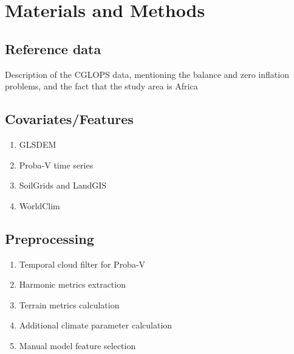 \documentclass[a4paper,10pt]{article}
\begin{document}
\section{Materials and Methods}

\subsection{Reference data}

Description of the CGLOPS data, mentioning the balance and zero inflation problems, and the fact that the study area is Africa

\subsection{Covariates/Features}

\begin{enumerate}
 \item GLSDEM
 \item Proba-V time series
 \item SoilGrids and LandGIS
 \item WorldClim
\end{enumerate}

\subsection{Preprocessing}

\begin{enumerate}
 \item Temporal cloud filter for Proba-V
 \item Harmonic metrics extraction
 \item Terrain metrics calculation
 \item Additional climate parameter calculation
 \item Manual model feature selection
\end{enumerate}
\end{document}
